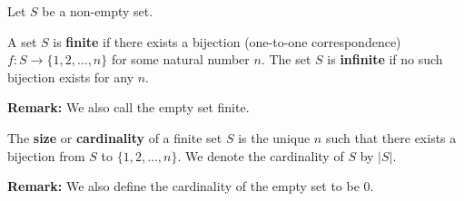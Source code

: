 \documentclass[12pt,letterpaper]{article}
\begin{document}
\thispagestyle{fancy}

%
%

Let $S$ be a non-empty set.

\begin{defn}
A set $S$ is {\bf finite} if there exists a bijection (one-to-one correspondence) $f: S \to \{1, 2, \dots, n\}$ for some natural number $n$. The set $S$ is {\bf infinite} if no such bijection exists for any $n$. 
\end{defn}

{\bf Remark:} We also call the empty set finite.

\begin{defn}
The {\bf size} or {\bf cardinality} of a finite set $S$ is the unique $n$ such that there exists a bijection from $S$ to $\{1, 2, \dots, n\}$. We denote the cardinality of $S$ by $|S|$.
\end{defn}

{\bf Remark:} We also define the cardinality of the empty set to be 0.
\end{document}
